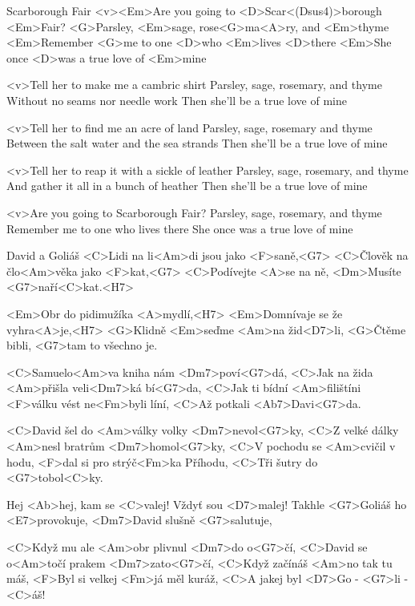 \begin{song}[Lidová]{83}{Scarborough Fair}{}
	<v><Em>Are you going to <D>Scar<(Dsus4)>borough <Em>Fair?
	<G>Parsley, <Em>sage, rose<G>ma<A>ry, and <Em>thyme
	<Em>Remember <G>me to one <D>who <Em>lives <D>there
	<Em>She once <D>was a true love of <Em>mine

	<v>Tell her to make me a cambric shirt
	Parsley, sage, rosemary, and thyme
	Without no seams nor needle work
	Then she'll be a true love of mine

	<v>Tell her to find me an acre of land
	Parsley, sage, rosemary and thyme
	Between the salt water and the sea strands
	Then she'll be a true love of mine

	<v>Tell her to reap it with a sickle of leather
	Parsley, sage, rosemary, and thyme
	And gather it all in a bunch of heather
	Then she'll be a true love of mine

	<v>Are you going to Scarborough Fair?
	Parsley, sage, rosemary, and thyme
	Remember me to one who lives there
	She once was a true love of mine
\end{song}

\begin{song}{86}{David a Goliáš}{}
	<C>Lidi na li<Am>di jsou jako <F>saně,<G7>
	<C>Člověk na člo<Am>věka jako <F>kat,<G7>
	<C>Podívejte <A>se na ně,
	<Dm>Musíte <G7>naří<C>kat.<H7>

	<Em>Obr do pidimužíka <A>mydlí,<H7>
	<Em>Domnívaje se že vyhra<A>je,<H7>
	<G>Klidně <Em>seďme <Am>na žid<D7>li,
	<G>Čtěme bibli, <G7>tam to všechno je.

	<C>Samuelo<Am>va kniha nám <Dm7>poví<G7>dá,
	<C>Jak na žida <Am>přišla veli<Dm7>ká bí<G7>da,
	<C>Jak ti bídní <Am>filištíni <F>válku vést ne<Fm>byli líní,
	<C>Až potkali <Ab7>Davi<G7>da.

	<C>David šel do <Am>války volky <Dm7>nevol<G7>ky,
	<C>Z velké dálky <Am>nesl bratrům <Dm7>homol<G7>ky,
	<C>V pochodu se <Am>cvičil v hodu, <F>dal si pro strýč<Fm>ka Příhodu,
	<C>Tři šutry do <G7>tobol<C>ky.

	Hej <Ab>hej, kam se <C>valej!
	Vždyť sou <D7>malej!
	Takhle <G7>Goliáš ho <E7>provokuje,
	<Dm7>David slušně <G7>salutuje,

	<C>Když mu ale <Am>obr plivnul <Dm7>do o<G7>čí,
	<C>David se o<Am>točí prakem <Dm7>zato<G7>čí,
	<C>Když začínáš <Am>no tak tu máš,
	<F>Byl si velkej <Fm>já měl kuráž,
	<C>A jakej byl <D7>Go - <G7>li - <C>áš!
\end{song}

